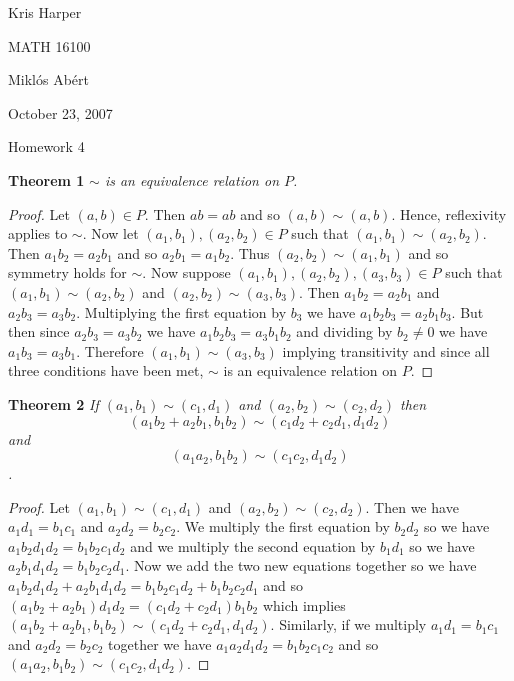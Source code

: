 \documentclass{article}
\begin{document}
\begin{flushright}
Kris Harper

MATH 16100

Mikl\'{o}s Ab\'{e}rt

October 23, 2007
\end{flushright}

\begin{center}
Homework 4
\end{center}

\begin{flushleft}

\textbf{Theorem 1}
\textsl{$\sim$ is an equivalence relation on $P$.}
\begin{proof}
Let $(a,b) \in P$. Then $ab=ab$ and so $(a,b) \sim (a,b)$. Hence, reflexivity applies to $\sim$. Now let $(a_1,b_1), (a_2,b_2) \in P$ such that $(a_1,b_1) \sim (a_2,b_2)$. Then $a_1b_2=a_2b_1$ and so $a_2b_1=a_1b_2$. Thus $(a_2,b_2) \sim (a_1,b_1)$ and so symmetry holds for $\sim$. Now suppose $(a_1,b_1), (a_2,b_2), (a_3,b_3) \in P$ such that $(a_1,b_1) \sim (a_2,b_2)$ and $(a_2,b_2) \sim (a_3,b_3)$. Then $a_1b_2=a_2b_1$ and $a_2b_3=a_3b_2$. Multiplying the first equation by $b_3$ we have $a_1b_2b_3=a_2b_1b_3$. But then since $a_2b_3=a_3b_2$ we have $a_1b_2b_3=a_3b_1b_2$ and dividing by $b_2 \neq 0$ we have $a_1b_3=a_3b_1$. Therefore $(a_1,b_1) \sim (a_3,b_3)$ implying transitivity and since all three conditions have been met, $\sim$ is an equivalence relation on $P$.
\end{proof}

\textbf{Theorem 2}
\textsl{If $(a_1,b_1) \sim (c_1,d_1)$ and $(a_2,b_2) \sim (c_2,d_2)$ then
\[
(a_1b_2+a_2b_1,b_1b_2) \sim (c_1d_2+c_2d_1,d_1d_2)
\]
and
\[
(a_1a_2,b_1b_2) \sim (c_1c_2,d_1d_2)
\].}
\begin{proof}
Let $(a_1,b_1) \sim (c_1,d_1)$ and $(a_2,b_2) \sim (c_2,d_2)$. Then we have $a_1d_1=b_1c_1$ and $a_2d_2=b_2c_2$. We multiply the first equation by $b_2d_2$ so we have $a_1b_2d_1d_2 = b_1b_2c_1d_2$ and we multiply the second equation by $b_1d_1$ so we have $a_2b_1d_1d_2 = b_1b_2c_2d_1$. Now we add the two new equations together so we have $a_1b_2d_1d_2 + a_2b_1d_1d_2 = b_1b_2c_1d_2 + b_1b_2c_2d_1$ and so $(a_1b_2+a_2b_1)d_1d_2 = (c_1d_2 + c_2d_1)b_1b_2$ which implies $(a_1b_2+a_2b_1,b_1b_2) \sim (c_1d_2+c_2d_1,d_1d_2)$. Similarly, if we multiply $a_1d_1=b_1c_1$ and $a_2d_2=b_2c_2$ together we have $a_1a_2d_1d_2=b_1b_2c_1c_2$ and so $(a_1a_2,b_1b_2) \sim (c_1c_2,d_1d_2)$.
\end{proof}


\end{flushleft}
\end{document}
